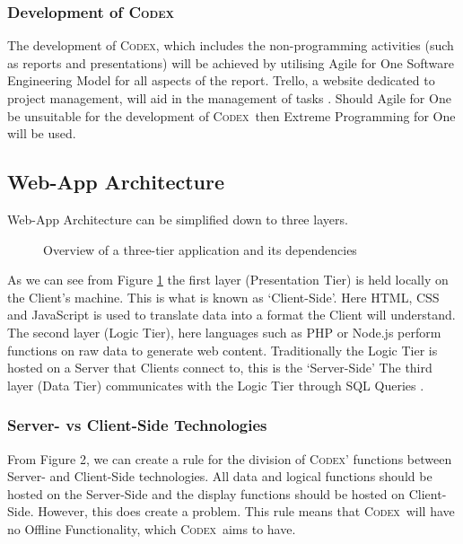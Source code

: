 \documentclass[review]{cmpreport}
\newcommand{\Codex}{\textsc{Codex}}
\begin{document}
	\subsubsection{Development of \Codex}
	The development of \Codex, which includes the non-programming activities (such as reports and presentations) will be achieved by utilising Agile for One Software Engineering Model for all aspects of the report. Trello, a website dedicated to project management, will aid in the management of tasks \citep{Trello}. Should Agile for One be unsuitable for the development of \Codex \ then Extreme Programming for One will be used.
	
	\clearpage 
	
	\subsection{Web-App Architecture} \label{Web-Arch}
	Web-App Architecture can be simplified down to three layers.
	\begin{figure}
		\centering
		\caption{Overview of a three-tier application and its dependencies \citep{SecurityWebApps}} \label{Web-App-Arch}
	\end{figure}
	As we can see from Figure \ref{Web-App-Arch} the first layer (Presentation Tier) is held locally on the Client's machine. This is what is known as `Client-Side'. Here HTML, CSS and JavaScript is used to translate data into a format the Client will understand. The second layer (Logic Tier), here languages such as PHP or Node.js perform functions on raw data to generate web content. Traditionally the Logic Tier is hosted on a Server that Clients connect to, this is the `Server-Side' The third layer (Data Tier) communicates with the Logic Tier through SQL Queries \citep{SecurityWebApps}.
	
	\subsubsection{Server- vs Client-Side Technologies}
	From Figure 2, we can create a rule for the division of \Codex' functions between Server- and Client-Side technologies. All data and logical functions should be hosted on the Server-Side and the display functions should be hosted on Client-Side. However, this does create a problem. This rule means that \Codex \ will have no Offline Functionality, which \Codex \ aims to have.
	
\end{document}
